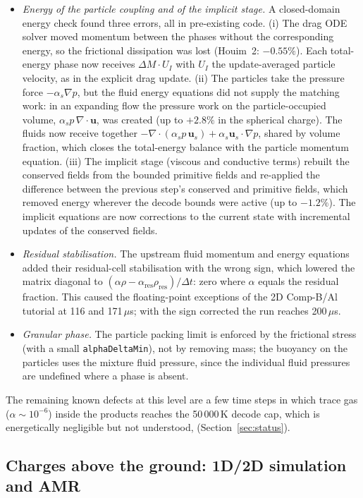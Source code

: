 \documentclass{article}
\begin{document}
\begin{itemize}
    \item \emph{Energy of the particle coupling and of the implicit stage.} A closed-domain energy check found three errors, all in pre-existing code. (i) The drag ODE solver moved momentum between the phases without the corresponding energy, so the frictional dissipation was lost (Houim~2: $-0.55\%$). Each total-energy phase now receives $\Delta M\cdot U_I$ with $U_I$ the update-averaged particle velocity, as in the explicit drag update. (ii) The particles take the pressure force $-\alpha_s\nabla p$, but the fluid energy equations did not supply the matching work: in an expanding flow the pressure work on the particle-occupied volume, $\alpha_s p\,\nabla\cdot\mathbf{u}$, was created (up to $+2.8\%$ in the spherical charge). The fluids now receive together $-\nabla\cdot(\alpha_s p\,\mathbf{u}_s) + \alpha_s\mathbf{u}_s\cdot\nabla p$, shared by volume fraction, which closes the total-energy balance with the particle momentum equation. (iii) The implicit stage (viscous and conductive terms) rebuilt the conserved fields from the bounded primitive fields and re-applied the difference between the previous step's conserved and primitive fields, which removed energy wherever the decode bounds were active (up to $-1.2\%$). The implicit equations are now corrections to the current state with incremental updates of the conserved fields.
    \item \emph{Residual stabilisation.} The upstream fluid momentum and energy equations added their residual-cell stabilisation with the wrong sign, which lowered the matrix diagonal to $(\alpha\rho - \alpha_\text{res}\rho_\text{res})/\Delta t$: zero where $\alpha$ equals the residual fraction. This caused the floating-point exceptions of the 2D Comp-B/Al tutorial at 116 and 171\,$\mu$s; with the sign corrected the run reaches 200\,$\mu$s.
    \item \emph{Granular phase.} The particle packing limit is enforced by the frictional stress (with a small \texttt{alphaDeltaMin}), not by removing mass; the buoyancy on the particles uses the mixture fluid pressure, since the individual fluid pressures are undefined where a phase is absent.
\end{itemize}

The remaining known defects at this level are a few time steps in which trace gas ($\alpha \sim 10^{-6}$) inside the products reaches the 50\,000\,K decode cap, which is energetically negligible but not understood, (Section~\ref{sec:status}).

\subsection{Charges above the ground: 1D/2D simulation and AMR}
\label{sec:mapping}
\end{document}
